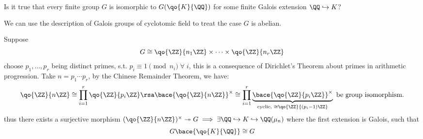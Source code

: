 \begin{remark}
	Is it true that every finite group \( G \) is isomorphic to \( G(\qo{K}{\QQ}) \) for some finite
	Galois extension \( \QQ \hookrightarrow K \)?
\end{remark}

\begin{note}
	We can use the description of Galois groups of cyclotomic field to treat the case \( G \) is abelian.

	Suppose
	\[
		G \cong \qo{\ZZ}{n_1\ZZ} \times \cdots \times \qo{\ZZ}{n_r\ZZ}
	\]
	choose \( p_1,\ldots, p_r \) being distinct primes, s.t. \( p_i \equiv 1 \pmod{n_i} \; \forall \; i \), this is a
	consequence of Dirichlet's Theorem about primes in arithmetic progression. Take \( n = p_1\cdots p_r \), by the
	Chinese Remainder Theorem, we have:
	\[
		\qo{\ZZ}{n\ZZ} \cong \prod_{i=1}^r \qo{\ZZ}{p_i \ZZ} \rsa \bace{\qo{\ZZ}{n\ZZ}}^\times \cong
		\prod_{i=1}^r \underbrace{\bace{\qo{\ZZ}{p_i \ZZ}}^\times}_{\text{cyclic, }\cong \qo{\ZZ}{(p_i-1)\ZZ}} \text{ be group isomorphism.}
	\]
	thus there exists a surjective morphism \( (\qo{\ZZ}{n\ZZ})^\times \twoheadrightarrow G \implies
	\exists \QQ \hookrightarrow K \hookrightarrow \QQ(\mu_n) \) where the first extension is Galois,
	such that
	\[
		G\bace{\qo{K}{\QQ}} \cong G
	\]
\end{note}

